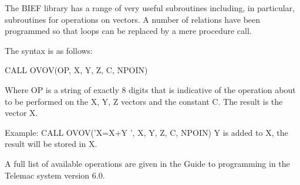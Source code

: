  The BIEF library has a range of very useful subroutines including, in particular, subroutines for operations on vectors. A number of relations have been programmed so that loops can be replaced by a mere procedure call.

 The syntax is as follows:

 CALL OVOV(OP, X, Y, Z, C, NPOIN)

 Where OP is a string of exactly 8 digits that is indicative of the operation about to be performed on the X, Y, Z vectors and the constant C. The result is the vector X.

 Example:  CALL OVOV('X=X+Y ', X, Y, Z, C, NPOIN)  Y is added to X, the result will be stored in X.

 A full list of available operations are given in the Guide to programming in the Telemac system version 6.0.
